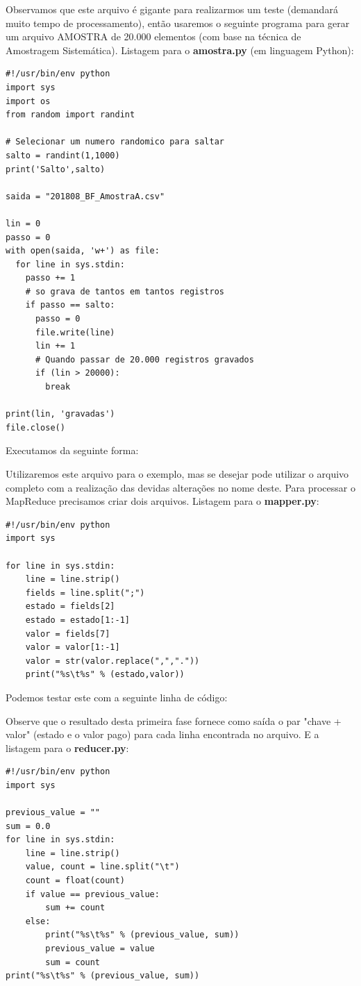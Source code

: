 \documentclass[a4paper,11pt]{article}
\begin{document}
Observamos que este arquivo é gigante para realizarmos um teste (demandará muito tempo de processamento), então usaremos o seguinte programa para gerar um arquivo AMOSTRA de 20.000 elementos (com base na técnica de Amostragem Sistemática). Listagem para o \textbf{amostra.py} (em linguagem Python):
\begin{lstlisting}[]
#!/usr/bin/env python
import sys
import os
from random import randint

# Selecionar um numero randomico para saltar
salto = randint(1,1000)
print('Salto',salto)

saida = "201808_BF_AmostraA.csv"

lin = 0
passo = 0
with open(saida, 'w+') as file:
  for line in sys.stdin:
    passo += 1
    # so grava de tantos em tantos registros
    if passo == salto:
      passo = 0
      file.write(line)            
      lin += 1
      # Quando passar de 20.000 registros gravados
      if (lin > 20000):
        break

print(lin, 'gravadas')
file.close()
\end{lstlisting}

Executamos da seguinte forma: \\

Utilizaremos este arquivo para o exemplo, mas se desejar pode utilizar o arquivo completo com a realização das devidas alterações no nome deste. Para processar o MapReduce precisamos criar dois arquivos. Listagem para o \textbf{mapper.py}:
\begin{lstlisting}[]
#!/usr/bin/env python
import sys

for line in sys.stdin:
	line = line.strip()
	fields = line.split(";")
	estado = fields[2]
	estado = estado[1:-1]
	valor = fields[7]
	valor = valor[1:-1]
	valor = str(valor.replace(",","."))
	print("%s\t%s" % (estado,valor))
\end{lstlisting}

Podemos testar este com a seguinte linha de código: \\

Observe que o resultado desta primeira fase fornece como saída o par "chave + valor" (estado e o valor pago) para cada linha encontrada no arquivo. E a listagem para o \textbf{reducer.py}:
\begin{lstlisting}[]
#!/usr/bin/env python
import sys

previous_value = ""
sum = 0.0
for line in sys.stdin:
	line = line.strip()
	value, count = line.split("\t")
	count = float(count)
	if value == previous_value:
		sum += count
	else:
		print("%s\t%s" % (previous_value, sum))
		previous_value = value
		sum = count
print("%s\t%s" % (previous_value, sum))
\end{lstlisting}
\end{document}
